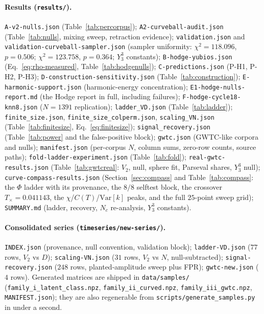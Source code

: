 \documentclass[11pt,a4paper]{article}
\theoremstyle{plain}
\theoremstyle{remark}
\theoremstyle{plain}
\begin{document}
\paragraph{Results (\texttt{results/}).}
\texttt{A-v2-nulls.json} (Table~\ref{tab:percorpus});
\texttt{A2-curveball-audit.json} (Table~\ref{tab:nulls}, mixing sweep, retraction evidence);
\texttt{validation.json} and \texttt{validation-curveball-sampler.json} (sampler uniformity: $\chi^2=118.096$, $p=0.506$; $\chi^2=123.758$, $p=0.364$; $Y_3^3$ constants);
\texttt{B-hodge-yubios.json} (Eq.~\eqref{eq:rho-measured}, Table~\ref{tab:hodgenulls});
\texttt{C-predictions.json} (P-H1, P-H2, P-H3);
\texttt{D-construction-sensitivity.json} (Table~\ref{tab:construction});
\texttt{E-harmonic-support.json} (harmonic-energy concentration);
\texttt{E1-hodge-nulls-report.md} (the Hodge report in full, including failures);
\texttt{F-hodge-cycle18-knn8.json} ($N=1391$ replication);
\texttt{ladder\_VD.json} (Table~\ref{tab:ladder});
\texttt{finite\_size.json}, \texttt{finite\_size\_colperm.json}, \texttt{scaling\_VN.json} (Table~\ref{tab:finitesize}, Eq.~\eqref{eq:finitesize});
\texttt{signal\_recovery.json} (Table~\ref{tab:power} and the false-positive block);
\texttt{gwtc.json} (GWTC-like corpora and nulls);
\texttt{manifest.json} (per-corpus $N$, column sums, zero-row counts, source paths);
\texttt{fold-ladder-experiment.json} (Table~\ref{tab:fold});
\texttt{real-gwtc-results.json} (Table~\ref{tab:gwtcreal}: $V_2$, null, sphere fit, Parseval shares, $Y_3^3$ null);
\texttt{curve-compass-results.json} (Section~\ref{sec:compass} and Table~\ref{tab:compass}: the $\Phi$ ladder with its provenance, the $8/8$ selftest block, the crossover $T_\times=0.041143$, the $\chi$/$C(T)$/$\mathrm{Var}[k]$ peaks, and the full $25$-point sweep grid);
\texttt{SUMMARY.md} (ladder, recovery, $N_c$ re-analysis, $Y_3^3$ constants).

\paragraph{Consolidated series (\texttt{timeseries/new-series/}).}
\texttt{INDEX.json} (provenance, null convention, validation block);
\texttt{ladder-VD.json} ($77$ rows, $V_2$ vs $D$);
\texttt{scaling-VN.json} ($31$ rows, $V_2$ vs $N$, null-subtracted);
\texttt{signal-recovery.json} ($248$ rows, planted-amplitude sweep plus FPR);
\texttt{gwtc-new.json} ($4$ rows).
Generated matrices are shipped in \texttt{data/samples/} (\texttt{family\_i\_latent\_class.npz}, \texttt{family\_ii\_curved.npz}, \texttt{family\_iii\_gwtc.npz}, \texttt{MANIFEST.json}); they are also regenerable from \texttt{scripts/generate\_samples.py} in under a second.
\end{document}
